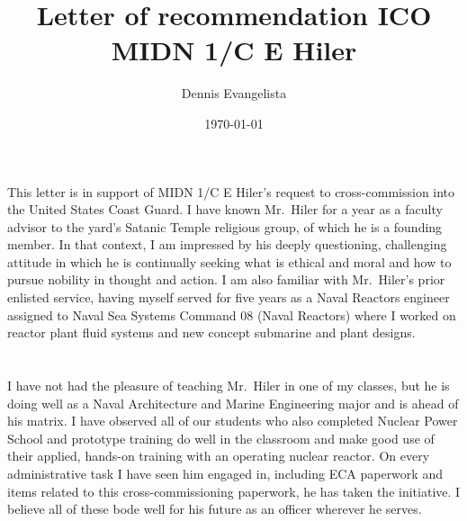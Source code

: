 \documentclass[10pt,courier]{navymemo}
\author{Dennis Evangelista}
\title{Letter of recommendation ICO MIDN 1/C E Hiler}
\date{\today}
\begin{document}
\makedateblock{}

\MEMORANDUM{}

\begin{navyletterheader}
\navyskip{}%
\navysubjline{}%
\end{navyletterheader}




\section{} 
This letter is in support of MIDN 1/C E Hiler's request to cross-commission into the United States Coast Guard. I have known Mr.~Hiler for a year as a faculty advisor to the yard's Satanic Temple religious group, of which he is a founding member. In that context, I am impressed by his deeply questioning, challenging attitude in which he is continually seeking what is ethical and moral and how to pursue nobility in thought and action. I am also familiar with Mr.~Hiler's prior enlisted service, having myself served for five years as a Naval Reactors engineer assigned to Naval Sea Systems Command 08 (Naval Reactors) where I worked on reactor plant fluid systems and new concept submarine and plant designs. 

\section{}
I have not had the pleasure of teaching Mr.~Hiler in one of my classes, but he is doing well as a Naval Architecture and Marine Engineering major and is ahead of his matrix. I have observed all of our students who also completed Nuclear Power School and prototype training do well in the classroom and make good use of their applied, hands-on training with an operating nuclear reactor. On every administrative task I have seen him engaged in, including ECA paperwork and items related to this cross-commissioning paperwork, he has taken the initiative. I believe all of these bode well for his future as an officer wherever he serves.
\end{document}
